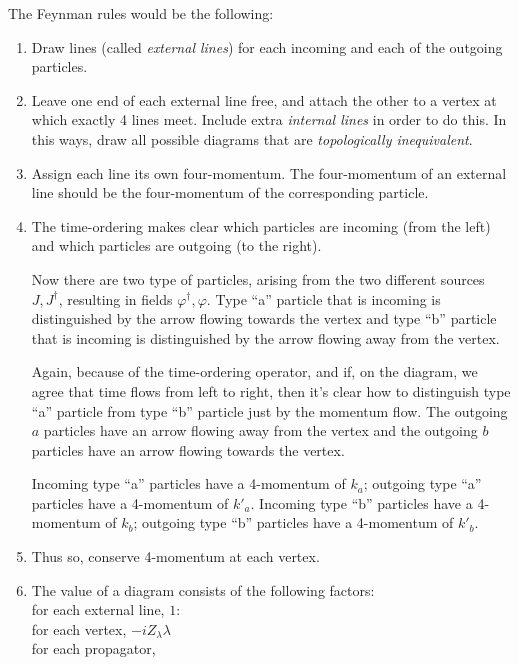 \documentclass[twoside]{amsart}
\newcommand{\solutionhead}[1]
  {\smallskip
   \noindent{\large\bf Solution #1.}
   }
\begin{document}
The Feynman rules would be the following:
\begin{enumerate}
\item Draw lines (called \emph{external lines}) for each incoming and each of the outgoing particles.
\item Leave one end of each external line free, and attach the other to a vertex at which exactly 4 lines meet.  Include extra \emph{internal lines} in order to do this.  In this ways, draw all possible diagrams that are \emph{topologically inequivalent}.  
\item Assign each line its own four-momentum.  The four-momentum of an external line should be the four-momentum of the corresponding particle.  
\item The time-ordering makes clear which particles are incoming (from the left) and which particles are outgoing (to the right).  

Now there are two type of particles, arising from the two different sources $J,J^{\dag}$, resulting in fields $\varphi^{\dag}, \varphi$.  Type ``a'' particle that is incoming is distinguished by the arrow flowing towards the vertex and type ``b'' particle that is incoming is distinguished by the arrow flowing away from the vertex.  

Again, because of the time-ordering operator, and if, on the diagram, we agree that time flows from left to right, then it's clear how to distinguish type ``a'' particle from type ``b'' particle just by the momentum flow.  The outgoing $a$ particles have an arrow flowing away from the vertex and the outgoing $b$ particles have an arrow flowing towards the vertex.  



Incoming type ``a'' particles have a 4-momentum of $k_a$; outgoing type ``a'' particles have a 4-momentum of $k'_a$.  Incoming type ``b'' particles have a 4-momentum of $k_b$; outgoing type ``b'' particles have a 4-momentum of $k'_b$.  
\item Thus so, conserve 4-momentum at each vertex.
\item The value of a diagram consists of the following factors: \\
for each external line, $1$: \\
for each vertex, $-iZ_{\lambda} \lambda$ \\
for each propagator, 
\end{enumerate}




\solutionhead{10.3} 
\end{document}
